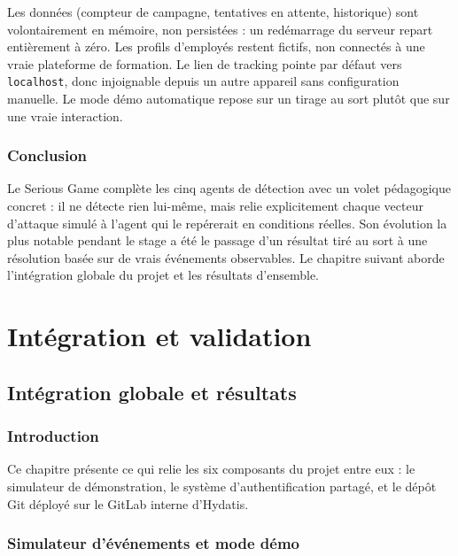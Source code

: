 \documentclass[12pt,a4paper]{report}
\begin{document}
Les données (compteur de campagne, tentatives en attente, historique) sont volontairement en mémoire, non persistées : un redémarrage du serveur repart entièrement à zéro. Les profils d'employés restent fictifs, non connectés à une vraie plateforme de formation. Le lien de tracking pointe par défaut vers \texttt{localhost}, donc injoignable depuis un autre appareil sans configuration manuelle. Le mode démo automatique repose sur un tirage au sort plutôt que sur une vraie interaction.

\section{Conclusion}

Le Serious Game complète les cinq agents de détection avec un volet pédagogique concret : il ne détecte rien lui-même, mais relie explicitement chaque vecteur d'attaque simulé à l'agent qui le repérerait en conditions réelles. Son évolution la plus notable pendant le stage a été le passage d'un résultat tiré au sort à une résolution basée sur de vrais événements observables. Le chapitre suivant aborde l'intégration globale du projet et les résultats d'ensemble.

\part{Intégration et validation}

\chapter{Intégration globale et résultats}

\section{Introduction}

Ce chapitre présente ce qui relie les six composants du projet entre eux : le simulateur de démonstration, le système d'authentification partagé, et le dépôt Git déployé sur le GitLab interne d'Hydatis.

\section{Simulateur d'événements et mode démo}
\end{document}
